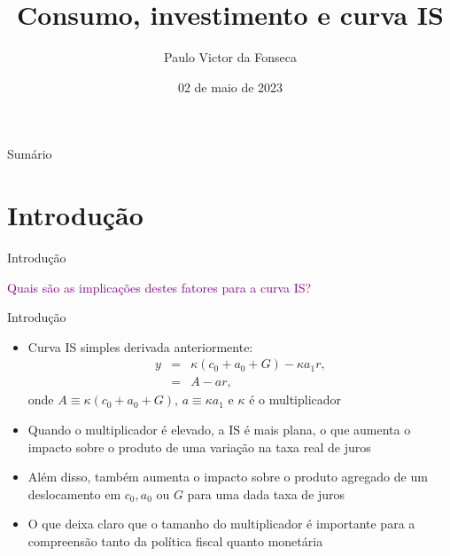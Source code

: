 \documentclass[10pt]{beamer}
\title[]{Consumo, investimento e curva IS}
\author[]{Paulo Victor da Fonseca}
\date{02 de maio de 2023}
\begin{document}
\begin{frame}[plain]
\end{frame}

\begin{frame}{Sumário}
    \tableofcontents
\end{frame}

\section{Introdução}
\begin{frame}
    {Introdução}
    \bigskip

    \textcolor{purple}{Quais são as implicações destes fatores para a curva IS?}
\end{frame}

\begin{frame}
    {Introdução}
    \begin{itemize}
        \item Curva IS simples derivada anteriormente:
        \begin{eqnarray}
            y &=& \kappa(c_0 + a_0 + G) - \kappa a_1 r, \nonumber \\
            &=& A - ar, \label{aula9_eq1}
        \end{eqnarray}
        onde $A \equiv \kappa(c_0 + a_0 + G)$, $a \equiv \kappa a_1$ e $\kappa$ é o multiplicador\bigskip
        \item Quando o multiplicador é elevado, a IS é mais plana, o que aumenta o impacto sobre o produto de uma variação na taxa real de juros\bigskip
        \item Além disso, também aumenta o impacto sobre o produto agregado de um deslocamento em $c_0, a_0$ ou $G$ para uma dada taxa de juros\bigskip
        \item O que deixa claro que o tamanho do multiplicador é importante para a compreensão tanto da política fiscal quanto monetária
    \end{itemize}
\end{frame}
\end{document}
